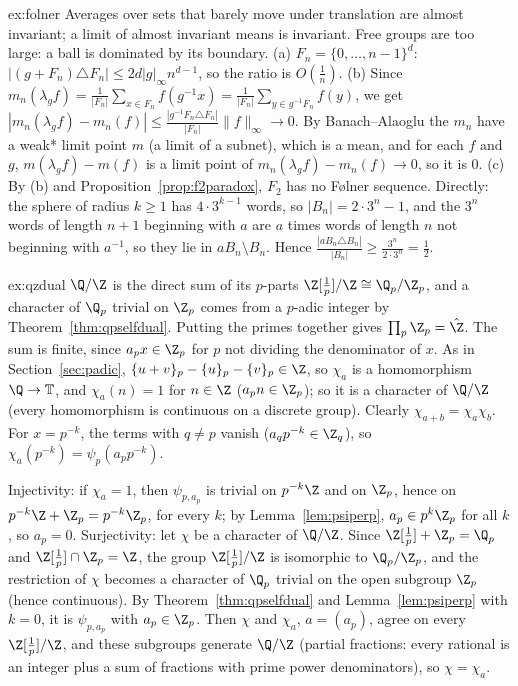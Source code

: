 \begin{solution}{ex:folner}
\idea Averages over sets that barely move under translation are almost invariant; a limit of almost invariant means is invariant. Free groups are
too large: a ball is dominated by its boundary.
\writeup (a) $F_n=\{0,\dots,n-1\}^d$: $|(g+F_n)\triangle F_n|\le2d|g|_\infty n^{d-1}$, so the ratio is $O(\frac1n)$. (b) Since $m_n(\lambda_gf)=\frac1{|F_n|}\sum_{x\in F_n}f(g^{-1}x)=\frac1{|F_n|}\sum_{y\in g^{-1}F_n}f(y)$, we get
$|m_n(\lambda_gf)-m_n(f)|\le\frac{|g^{-1}F_n\triangle F_n|}{|F_n|}\|f\|_\infty\to0$. By Banach--Alaoglu the $m_n$ have a weak* limit point $m$ (a limit of a subnet), which is a mean, and for each $f$ and $g$,
$m(\lambda_gf)-m(f)$ is a limit point of $m_n(\lambda_gf)-m_n(f)\to0$, so it is $0$. (c) By (b) and Proposition~\ref{prop:f2paradox}, $F_2$ has no F{\o}lner sequence. Directly: the
sphere of radius $k\ge1$ has $4\cdot3^{k-1}$ words, so $|B_n|=2\cdot3^n-1$, and the $3^n$ words of length $n+1$ beginning with $a$ are $a$ times words of length $n$ not beginning
with $a^{-1}$, so they lie in $aB_n\setminus B_n$. Hence $\frac{|aB_n\triangle B_n|}{|B_n|}\ge\frac{3^n}{2\cdot3^n}=\frac12$.
\end{solution}

\begin{solution}{ex:qzdual}
\idea $\Q/\Z$ is the direct sum of its $p$-parts $\Z[\frac1p]/\Z\cong\Q_p/\Z_p$, and a character of $\Q_p$ trivial on $\Z_p$ comes from a $p$-adic integer by
Theorem~\ref{thm:qpselfdual}. Putting the primes together gives $\prod_p\Z_p=\hat{\Z}$.
\writeup The sum is finite, since $a_px\in\Z_p$ for $p$ not dividing the denominator of $x$. As in Section~\ref{sec:padic}, $\{u+v\}_p-\{u\}_p-\{v\}_p\in\Z$, so $\chi_a$ is a homomorphism
$\Q\to\mathbb T$, and $\chi_a(n)=1$ for $n\in\Z$ ($a_pn\in\Z_p$); so it is a character of $\Q/\Z$ (every homomorphism is continuous on a discrete group). Clearly $\chi_{a+b}=\chi_a\chi_b$.
For $x=p^{-k}$, the terms with $q\ne p$ vanish ($a_qp^{-k}\in\Z_q$), so $\chi_a(p^{-k})=\psi_p(a_pp^{-k})$.

Injectivity: if $\chi_a=1$, then $\psi_{p,a_p}$ is trivial on $p^{-k}\Z$ and on $\Z_p$, hence on $p^{-k}\Z+\Z_p=p^{-k}\Z_p$, for every $k$; by Lemma~\ref{lem:psiperp}, $a_p\in p^k\Z_p$ for all $k$, so
$a_p=0$. Surjectivity: let $\chi$ be a character of $\Q/\Z$. Since $\Z[\frac1p]+\Z_p=\Q_p$ and $\Z[\frac1p]\cap\Z_p=\Z$, the group $\Z[\frac1p]/\Z$ is isomorphic to $\Q_p/\Z_p$, and the restriction of $\chi$
becomes a character of $\Q_p$ trivial on the open subgroup $\Z_p$ (hence continuous). By Theorem~\ref{thm:qpselfdual} and Lemma~\ref{lem:psiperp} with $k=0$, it is $\psi_{p,a_p}$ with
$a_p\in\Z_p$. Then $\chi$ and $\chi_a$, $a=(a_p)$, agree on every $\Z[\frac1p]/\Z$, and these subgroups generate $\Q/\Z$ (partial fractions: every rational is an integer plus a sum of
fractions with prime power denominators), so $\chi=\chi_a$.
\end{solution}

